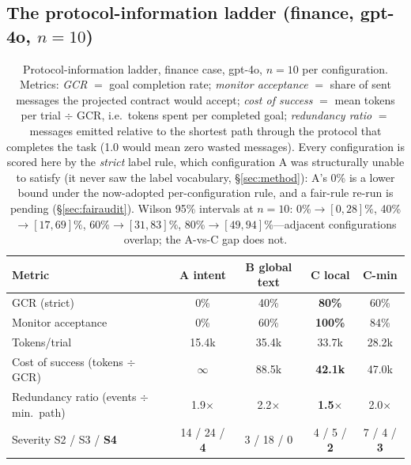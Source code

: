 \documentclass{article}
\begin{document}
\subsection{The protocol-information ladder (finance, gpt-4o, $n{=}10$)}
\begin{table}[t]
\centering\small
\caption{Protocol-information ladder, finance case, gpt-4o, $n{=}10$ per configuration. Metrics: \emph{GCR} $=$ goal completion rate; \emph{monitor acceptance} $=$ share of sent messages the projected contract would accept; \emph{cost of success} $=$ mean tokens per trial $\div$ GCR, i.e.\ tokens spent per completed goal; \emph{redundancy ratio} $=$ messages emitted relative to the shortest path through the protocol that completes the task (1.0 would mean zero wasted messages). Every configuration is scored here by the \emph{strict} label rule, which configuration A was structurally unable to satisfy (it never saw the label vocabulary, \S\ref{sec:method}): A's 0\% is a lower bound under the now-adopted per-configuration rule, and a fair-rule re-run is pending (\S\ref{sec:fairaudit}). Wilson 95\% intervals at $n{=}10$: 0\%$\to[0,28]\%$, 40\%$\to[17,69]\%$, 60\%$\to[31,83]\%$, 80\%$\to[49,94]\%$---adjacent configurations overlap; the A-vs-C gap does not.}
\label{tab:ladder}
\begin{tabular}{@{}lcccc@{}}
\toprule
\textbf{Metric} & \textbf{A intent} & \textbf{B global text} & \textbf{C local} & \textbf{C-min} \\
\midrule
GCR (strict) & 0\% & 40\% & \textbf{80\%} & 60\% \\
Monitor acceptance & 0\% & 60\% & \textbf{100\%} & 84\% \\
Tokens/trial & 15.4k & 35.4k & 33.7k & 28.2k \\
Cost of success (tokens $\div$ GCR) & $\infty$ & 88.5k & \textbf{42.1k} & 47.0k \\
Redundancy ratio (events $\div$ min.\ path) & 1.9$\times$ & 2.2$\times$ & \textbf{1.5}$\times$ & 2.0$\times$ \\
\midrule
Severity S2 / S3 / \textbf{S4} & 14 / 24 / \textbf{4} & 3 / 18 / 0 & 4 / 5 / \textbf{2} & 7 / 4 / \textbf{3} \\
\bottomrule
\end{tabular}
\end{table}
\end{document}
